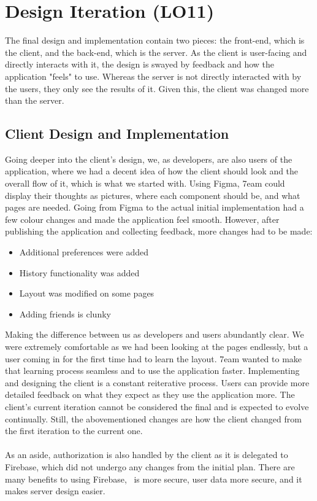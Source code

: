 \documentclass{article}
\begin{document}
\section{Design Iteration (LO11)}


\noindent The final design and implementation contain two pieces: the front-end, which is the client, and the back-end, which is the server. As the client is user-facing and directly interacts with it, the design is swayed by feedback and how the application "feels" to use. Whereas the server is not directly interacted with by the users, they only see the results of it. Given this, the client was changed more than the server.

\subsection{Client Design and Implementation}
Going deeper into the client's design, we, as developers, are also users of the application, where we had a decent idea of how the client should look and the overall flow of it, which is what we started with. Using Figma, 7eam could display their thoughts as pictures, where each component should be, and what pages are needed. Going from Figma to the actual initial implementation had a few colour changes and made the application feel smooth. However, after publishing the application and collecting feedback, more changes had to be made:
\begin{itemize}
	\item Additional preferences were added
	\item History functionality was added
	\item Layout was modified on some pages
	\item Adding friends is clunky
\end{itemize}
Making the difference between us as developers and users abundantly clear. We were extremely comfortable as we had been looking at the pages endlessly, but a user coming in for the first time had to learn the layout. 7eam wanted to make that learning process seamless and to use the application faster. Implementing and designing the client is a constant reiterative process. Users can provide more detailed feedback on what they expect as they use the application more. The client's current iteration cannot be considered the final and is expected to evolve continually. Still, the abovementioned changes are how the client changed from the first iteration to the current one.
\\~\\ As an aside, authorization is also handled by the client as it is delegated to Firebase, which did not undergo any changes from the initial plan. There are many benefits to using Firebase, \progname ~is more secure, user data more secure, and it makes server design easier.
\end{document}
